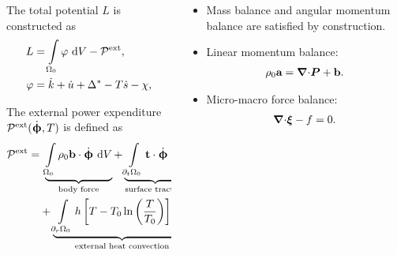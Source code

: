 \begin{frame}
  \vspace{-1.5em}
  \begin{columns}[T]
    \begin{column}{0.6\textwidth}
      The total potential $L$ is constructed as
      \begin{align*}
        L       & = \int\limits_{\Omega_0} \varphi \text{ d}V - \mathcal{P}^\text{ext}, \\
        \varphi & = \dot{k} + \dot{u} + \Delta^* - T\dot{s} - \chi,                  
      \end{align*}
      
      The external power expenditure $\mathcal{P}^\text{ext}(\dot{\boldsymbol{\upphi}}, T)$ is defined as
      \begin{equation*}
        \begin{aligned}
          \mathcal{P}^\text{ext} = & \ \underbrace{\int\limits_{\body_0} \rho_0 \btb \cdot \defrate \diff{V}}_\text{body force} + \underbrace{\int\limits_{\partial_t\body_0} \btt \cdot \defrate \diff{A}}_\text{surface traction} + \underbrace{\int\limits_{\partial_h\body_0} \bar{h}_n\ln\left( \dfrac{T}{T_0} \right) \diff{A}}_\text{external heat flux} \\
                                   & + \underbrace{\int\limits_{\partial_r\body_0} h\left[ T - T_0 \ln\left( \dfrac{T}{T_0} \right) \right] \diff{A}}_\text{external heat convection} - \underbrace{\int\limits_{\body_0} \rho_0 q \ln\left( \dfrac{T}{T_0} \right) \diff{V}}_\text{heat source},                                                               
        \end{aligned}
      \end{equation*}
    \end{column}
    \pause
    \begin{column}{0.4\textwidth}
      \begin{itemize}
        \item<2-> Mass balance and angular momentum balance are satisfied by construction.
        \item<3-> Linear momentum balance:
        \begin{align*}
          \rho_0\textbf{a} = {\boldsymbol{\nabla} \cdot}\boldsymbol{P} + \textbf{b}.
        \end{align*}
        \item<4-> Micro-macro force balance:
        \begin{align*}
          {\boldsymbol{\nabla}\cdot} \boldsymbol{\xi} - f = 0.
        \end{align*}

\end{itemize}
\end{column}
\end{columns}
\end{frame}
